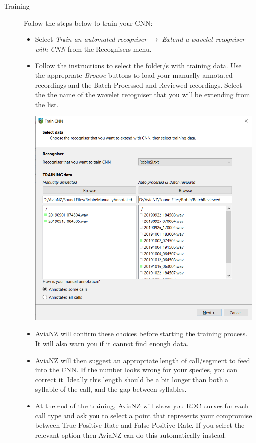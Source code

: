 \documentclass{scrartcl}
\begin{document}
\begin{description}
\item[Training] Follow the steps below to train your CNN:
\begin{itemize}
\item Select \textit{Train an automated recogniser} $\rightarrow$ \textit{Extend a wavelet recogniser with CNN} from the Recognisers menu. 
\item Follow the instructions to select the folder/s with training data. Use the appropriate \textit{Browse} buttons to load your manually annotated recordings and the Batch Processed and Reviewed recordings. Select the the name of the wavelet recogniser that you will be extending from the list. 

\begin{center}
    \includegraphics[width=.7\textwidth]{Figures/CNNpage1}
\end{center}

\item AviaNZ will confirm these choices before starting the training process. It will also warn you if it cannot find enough data. 
\item AviaNZ will then suggest an appropriate length of call/segment to feed into the CNN. If the number looks wrong for your species, you can correct it. Ideally this length should be a bit longer than both a syllable of the call, and the gap between syllables. 
\item At the end of the training, AviaNZ will show you ROC curves for each call type and ask you to select a point that represents your compromise between True Positive Rate and False Positive Rate. If you select the relevant option then AviaNZ can do this automatically instead.


\end{itemize}
\end{description}
\end{document}
